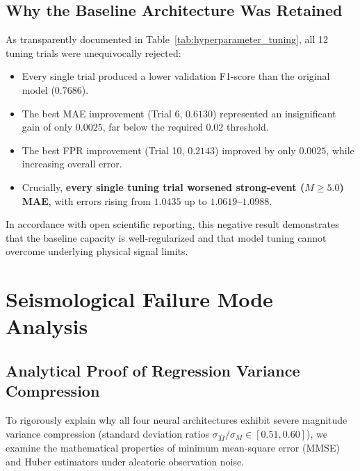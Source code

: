 \documentclass[journal]{IEEEtran}
\begin{document}
\subsection{Why the Baseline Architecture Was Retained}
As transparently documented in Table~\ref{tab:hyperparameter_tuning}, all 12 tuning trials were unequivocally rejected:
\begin{itemize}
    \item Every single trial produced a lower validation F1-score than the original model ($0.7686$).
    \item The best MAE improvement (Trial 6, $0.6130$) represented an insignificant gain of only $0.0025$, far below the required $0.02$ threshold.
    \item The best FPR improvement (Trial 10, $0.2143$) improved by only $0.0025$, while increasing overall error.
    \item Crucially, \textbf{every single tuning trial worsened strong-event ($M \ge 5.0$) MAE}, with errors rising from $1.0435$ up to $1.0619$--$1.0988$.
\end{itemize}
In accordance with open scientific reporting, this negative result demonstrates that the baseline capacity is well-regularized and that model tuning cannot overcome underlying physical signal limits.

\section{Seismological Failure Mode Analysis}

\subsection{Analytical Proof of Regression Variance Compression}
To rigorously explain why all four neural architectures exhibit severe magnitude variance compression (standard deviation ratios $\sigma_{\hat{M}}/\sigma_M \in [0.51, 0.60]$), we examine the mathematical properties of minimum mean-square error (MMSE) and Huber estimators under aleatoric observation noise.
\end{document}
